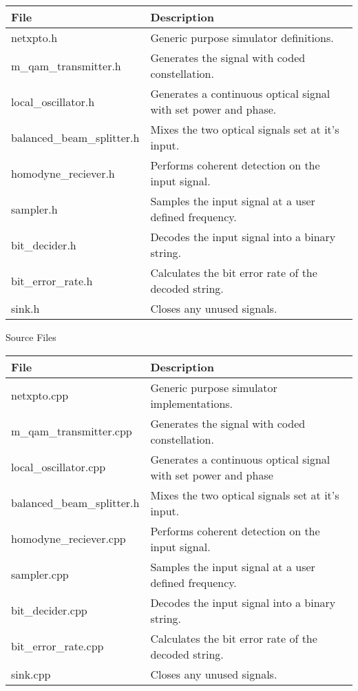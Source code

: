 \begin{table}[H]
\centering
\begin{tabulary}{1.0\textwidth}{|L|L|}
\hline
\textbf{File}              & \textbf{Description} 				                  \\ \hline
netxpto.h                  & Generic purpose simulator definitions.	              \\ \hline
m\_qam\_transmitter.h      & Generates the signal with coded constellation.       \\ \hline
local\_oscillator.h        & Generates a continuous optical signal with set power and phase. \\ \hline
balanced\_beam\_splitter.h & Mixes the two optical signals set at it's input. \\ \hline
homodyne\_reciever.h       & Performs coherent detection on the input signal.     \\ \hline
sampler.h                  & Samples the input signal at a user defined frequency. \\ \hline
bit\_decider.h             & Decodes the input signal into a binary string.       \\ \hline
bit\_error\_rate.h         & Calculates the bit error rate of the decoded string. \\ \hline
sink.h                     & Closes any unused signals.                           \\ \hline
\end{tabulary}
\end{table}		
%
Source Files
\begin{table}[H]
\centering
\begin{tabulary}{1.0\textwidth}{|L|L|}
\hline
\textbf{File}           & \textbf{Description} 					             \\ \hline
netxpto.cpp             & Generic purpose simulator implementations.           \\ \hline
m\_qam\_transmitter.cpp &  Generates the signal with coded constellation.      \\ \hline
local\_oscillator.cpp   & Generates a continuous optical signal with set power and phase \\ \hline
balanced\_beam\_splitter.h & Mixes the two optical signals set at it's input. \\ \hline
homodyne\_reciever.cpp  & Performs coherent detection on the input signal.     \\ \hline
sampler.cpp             & Samples the input signal at a user defined frequency. \\ \hline
bit\_decider.cpp        & Decodes the input signal into a binary string.       \\ \hline
bit\_error\_rate.cpp    & Calculates the bit error rate of the decoded string. \\ \hline
sink.cpp                & Closes any unused signals.                           \\ \hline
\end{tabulary}
\end{table}		

